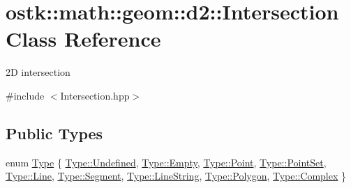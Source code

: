 \hypertarget{classostk_1_1math_1_1geom_1_1d2_1_1_intersection}{}\section{ostk\+:\+:math\+:\+:geom\+:\+:d2\+:\+:Intersection Class Reference}
\label{classostk_1_1math_1_1geom_1_1d2_1_1_intersection}


2D intersection  




{\ttfamily \#include $<$Intersection.\+hpp$>$}

\subsection*{Public Types}
\begin{DoxyCompactItemize}
\item 
enum \hyperlink{classostk_1_1math_1_1geom_1_1d2_1_1_intersection_a8712ffbb37647ed5212ff8ba6da68b00}{Type} \{ \newline
\hyperlink{classostk_1_1math_1_1geom_1_1d2_1_1_intersection_a8712ffbb37647ed5212ff8ba6da68b00aec0fc0100c4fc1ce4eea230c3dc10360}{Type\+::\+Undefined}, 
\hyperlink{classostk_1_1math_1_1geom_1_1d2_1_1_intersection_a8712ffbb37647ed5212ff8ba6da68b00ace2c8aed9c2fa0cfbed56cbda4d8bf07}{Type\+::\+Empty}, 
\hyperlink{classostk_1_1math_1_1geom_1_1d2_1_1_intersection_a8712ffbb37647ed5212ff8ba6da68b00a2a3cd5946cfd317eb99c3d32e35e2d4c}{Type\+::\+Point}, 
\hyperlink{classostk_1_1math_1_1geom_1_1d2_1_1_intersection_a8712ffbb37647ed5212ff8ba6da68b00aaedf8f48dfa5b704b6c12b415707a1da}{Type\+::\+Point\+Set}, 
\newline
\hyperlink{classostk_1_1math_1_1geom_1_1d2_1_1_intersection_a8712ffbb37647ed5212ff8ba6da68b00a4803e6b9e63dabf04de980788d6a13c4}{Type\+::\+Line}, 
\hyperlink{classostk_1_1math_1_1geom_1_1d2_1_1_intersection_a8712ffbb37647ed5212ff8ba6da68b00a4b77e2a9d8e9cfc299f504b32d6e3d2b}{Type\+::\+Segment}, 
\hyperlink{classostk_1_1math_1_1geom_1_1d2_1_1_intersection_a8712ffbb37647ed5212ff8ba6da68b00a2e321465690359abbb020a3619b1c937}{Type\+::\+Line\+String}, 
\hyperlink{classostk_1_1math_1_1geom_1_1d2_1_1_intersection_a8712ffbb37647ed5212ff8ba6da68b00a4c0a11247d92f73fb84baa51e37a3263}{Type\+::\+Polygon}, 
\newline
\hyperlink{classostk_1_1math_1_1geom_1_1d2_1_1_intersection_a8712ffbb37647ed5212ff8ba6da68b00a10b4eb76294b70d7fd6df997ff06edb1}{Type\+::\+Complex}
 \}
\end{DoxyCompactItemize}
